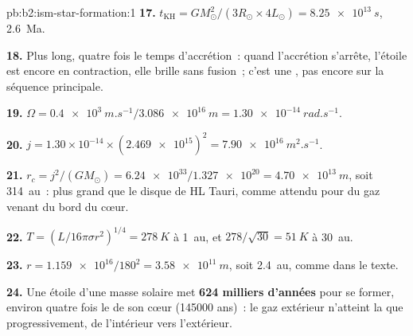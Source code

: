 \begin{solution}{pb:b2:ism-star-formation:1}
\textbf{17.} $t_{\mathrm{KH}} = GM_\odot^2/(3R_\odot\times4L_\odot) = \qty{8.25e13}{s}$,
\qty{2.6}{Ma}.

\textbf{18.} Plus long, quatre fois le temps d'accrétion~: quand l'accrétion s'arrête, l'étoile est
encore en contraction, elle brille sans fusion~; c'est une , pas encore sur la séquence
principale.

\textbf{19.} $\Omega = \qty{0.4e3}{m.s^{-1}}/\qty{3.086e16}{m} = \qty{1.30e-14}{rad.s^{-1}}$.

\textbf{20.} $j = 1.30\times10^{-14}\times(\num{2.469e15})^2 = \qty{7.90e16}{m^2.s^{-1}}$.

\textbf{21.} $r_c = j^2/(GM_\odot) = \num{6.24e33}/\num{1.327e20} = \qty{4.70e13}{m}$, soit
\qty{314}{au}~: plus grand que le disque de HL Tauri, comme attendu pour du gaz venant du bord du
cœur.

\textbf{22.} $T = (L/16\pi\sigma r^2)^{1/4} = \qty{278}{K}$ à \qty{1}{au}, et
$278/\sqrt{30} = \qty{51}{K}$ à \qty{30}{au}.

\textbf{23.} $r = \num{1.159e16}/180^2 = \qty{3.58e11}{m}$, soit \qty{2.4}{au}, comme dans le texte.

\textbf{24.} Une étoile d'une masse solaire met
\textbf{\qty[text-series-to-math=true]{624}{} milliers d'années} pour se former, environ quatre
fois le  de son cœur (\num{145000} ans)~: le gaz extérieur n'atteint
la  que progressivement, de l'intérieur vers l'extérieur.
\end{solution}
